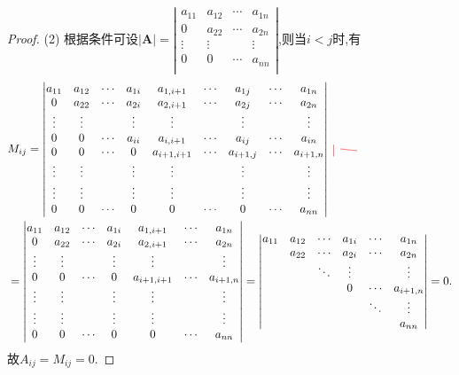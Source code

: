 \documentclass[../../main.tex]{subfiles}%
\begin{document}
\begin{proof}
(2) 根据条件可设$\left| \boldsymbol{A} \right|=\left| \begin{matrix}
a_{11}&		a_{12}&		\cdots&		a_{1n}\\
0&		a_{22}&		\cdots&		a_{2n}\\
\vdots&		\vdots&		&		\vdots\\
0&		0&		\cdots&		a_{nn}\\
\end{matrix} \right|$,则当$i<j$时,有
\begin{align*}
& M_{ij}=\left| \begin{matrix}
a_{11}&		a_{12}&		\cdots&		a_{1i}&		a_{1,i+1}&		\cdots&		\MyTikzmark{topA}{a_{1j}}&		\cdots&		a_{1n}\\
0&		a_{22}&		\cdots&		a_{2i}&		a_{2,i+1}&		\cdots&		a_{2j}&		\cdots&		a_{2n}\\
\vdots&		\vdots&		&		\vdots&		\vdots&		&		\vdots&		&		\vdots\\
\MyTikzmark{leftA}{0}&		0&		\cdots&		a_{ii}&		a_{i,i+1}&		\cdots&		a_{ij}&		\cdots&		\MyTikzmark{rightA}{a_{in}}\\
0&		0&		\cdots&		0&		a_{i+1,i+1}&		\cdots&		a_{i+1,j}&		\cdots&		a_{i+1,n}\\
\vdots&		\vdots&		&		\vdots&		\vdots&		&		\vdots&		&		\vdots\\
\vdots&		\vdots&		&		\vdots&		\vdots&		&		\vdots&		&		\vdots\\
0&		0&		\cdots&		0&		0&		\cdots&		\MyTikzmark{bottomA}{0}&		\cdots&		a_{nn}\\
\end{matrix} \right|
\text{\DrawVLine[red, thick, opacity=0.5]{topA}{bottomA}
\DrawHLine[red, thick, opacity=0.5]{leftA}{rightA}}
\\
&=\left| \begin{matrix}
a_{11}&		a_{12}&		\cdots&		a_{1i}&		a_{1,i+1}&		\cdots&		a_{1n}\\
0&		a_{22}&		\cdots&		a_{2i}&		a_{2,i+1}&		\cdots&		a_{2n}\\
\vdots&		\vdots&		&		\vdots&		\vdots&		&		\vdots\\
0&		0&		\cdots&		0&		a_{i+1,i+1}&		\cdots&		a_{i+1,n}\\
\vdots&		\vdots&		&		\vdots&		\vdots&		&		\vdots\\
\vdots&		\vdots&		&		\vdots&		\vdots&		&		\vdots\\
0&		0&		\cdots&		0&		0&		\cdots&		a_{nn}\\
\end{matrix} \right|=\left| \begin{matrix}
a_{11}&		a_{12}&		\cdots&		a_{1i}&		\cdots&		a_{1n}\\
&		a_{22}&		\cdots&		a_{2i}&		\cdots&		a_{2n}\\
&		&		\ddots&		\vdots&		&		\vdots\\
&		&		&		0&		\cdots&		a_{i+1,n}\\
&		&		&		&		\ddots&		\vdots\\
&		&		&		&		&		a_{nn}\\
\end{matrix} \right|=0.
\end{align*}
故\(A_{ij}=M_{ij}=0\).


\end{proof}
\end{document}
